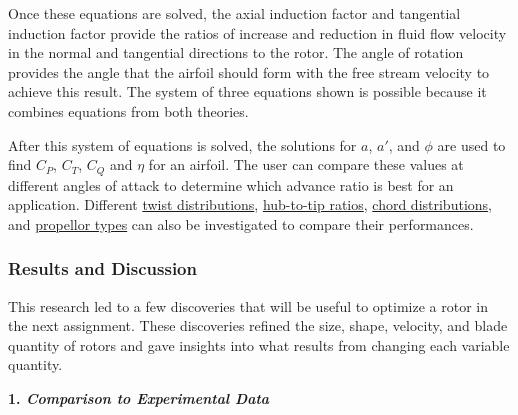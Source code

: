 \documentclass{article}
\begin{document}
Once these equations are solved, the axial induction factor and tangential induction factor provide the ratios of increase and reduction in fluid flow velocity in the normal and tangential directions to the rotor. The angle of rotation provides the angle that the airfoil should form with the free stream velocity to achieve this result. The system of three equations shown is possible because it combines equations from both theories. \newline

After this system of equations is solved, the solutions for $a$, $a'$, and $\phi$ are used to find $C_{P}$, $C_{T}$, $C_{Q}$ and $\eta$ for an airfoil. The user can compare these values at different angles of attack to determine which advance ratio is best for an application. Different \hyperlink{T}{twist distributions}, \hyperlink{D/D}{hub-to-tip ratios}, \hyperlink{c}{chord distributions}, and \hyperlink{APC}{propellor types} can also be investigated to compare their performances. \newline

\subsubsection*{Results and Discussion}

This research led to a few discoveries that will be useful to optimize a rotor in the next assignment. These discoveries refined the size, shape, velocity, and blade quantity of rotors and gave insights into what results from changing each variable quantity. \newline

\textbf{1. \emph{Comparison to Experimental Data}} \newline
\end{document}
